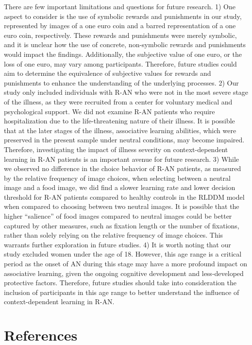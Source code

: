 \documentclass[
  man,floatsintext]{apa6}
\begin{document}
There are few important limitations and questions for future research. 1) One aspect to consider is the use of symbolic rewards and punishments in our study, represented by images of a one euro coin and a barred representation of a one euro coin, respectively. These rewards and punishments were merely symbolic, and it is unclear how the use of concrete, non-symbolic rewards and punishments would impact the findings. Additionally, the subjective value of one euro, or the loss of one euro, may vary among participants. Therefore, future studies could aim to determine the equivalence of subjective values for rewards and punishments to enhance the understanding of the underlying processes. 2) Our study only included individuals with R-AN who were not in the most severe stage of the illness, as they were recruited from a center for voluntary medical and psychological support. We did not examine R-AN patients who require hospitalization due to the life-threatening nature of their illness. It is possible that at the later stages of the illness, associative learning abilities, which were preserved in the present sample under neutral conditions, may become impaired. Therefore, investigating the impact of illness severity on context-dependent learning in R-AN patients is an important avenue for future research. 3) While we observed no difference in the choice behavior of R-AN patients, as measured by the relative frequency of image choices, when selecting between a neutral image and a food image, we did find a slower learning rate and lower decision threshold for R-AN patients compared to healthy controls in the RLDDM model when compared to choosing between two neutral images. It is possible that the higher ``salience'' of food images compared to neutral images could be better captured by other measures, such as fixation length or the number of fixations, rather than solely relying on the relative frequency of image choices. This warrants further exploration in future studies. 4) It is worth noting that our study excluded women under the age of 18. However, this age range is a critical period as the onset of AN during this stage may have a more profound impact on associative learning, given the ongoing cognitive development and less-developed protective factors. Therefore, future studies should take into consideration the inclusion of participants in this age range to better understand the influence of context-dependent learning in R-AN.

\newpage

\hypertarget{references}{%
\section{References}\label{references}}
\end{document}
